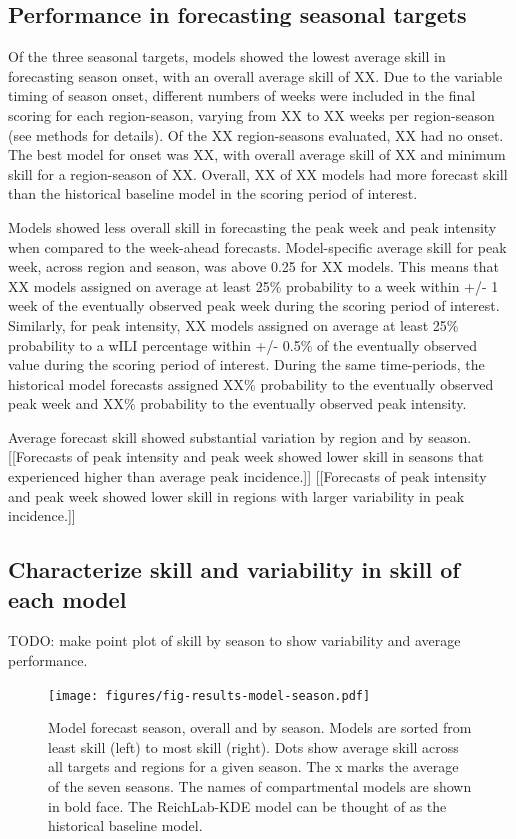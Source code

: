 \documentclass{article}\usepackage[]{graphicx}\usepackage[]{color}
\begin{document}
\subsection{Performance in forecasting seasonal targets}

Of the three seasonal targets, models showed the lowest average skill in forecasting season onset, with an overall average skill of XX. 
Due to the variable timing of season onset, different numbers of weeks were included in the final scoring for each region-season, varying from XX to XX weeks per region-season (see methods for details).
Of the XX region-seasons evaluated, XX had no onset. 
The best model for onset was XX, with overall average skill of XX and minimum skill for a region-season of XX.
Overall, XX of XX models had more forecast skill than the historical baseline model in the scoring period of interest.


Models showed less overall skill in forecasting the peak week and peak intensity when compared to the week-ahead forecasts.
Model-specific average skill for peak week, across region and season, was above 0.25 for XX models. 
This means that XX models assigned on average at least 25\% probability to a week within +/- 1 week of the eventually observed peak week during the scoring period of interest.
Similarly, for peak intensity, XX models assigned on average at least 25\% probability to a wILI percentage within +/- 0.5\% of the eventually observed value during the scoring period of interest.
During the same time-periods, the historical model forecasts assigned XX\% probability to the eventually observed peak week and XX\% probability to the eventually observed peak intensity.

Average forecast skill showed substantial variation by region and by season.
[[Forecasts of peak intensity and peak week showed lower skill in seasons that experienced higher than average peak incidence.]]
[[Forecasts of peak intensity and peak week showed lower skill in regions with larger variability in peak incidence.]]

\subsection{Characterize skill and variability in skill of each model}

TODO: make point plot of skill by season to show variability and average performance.

\begin{figure}[htbp]
\begin{center}
\texttt{[image: figures/fig-results-model-season.pdf]}
\caption{Model forecast season, overall and by season. Models are sorted from least skill (left) to most skill (right). Dots show average skill across all targets and regions for a given season. The x marks the average of the seven seasons. The names of compartmental models are shown in bold face. The ReichLab-KDE model can be thought of as the historical baseline model.}
\label{fig:results-season}
\end{center}
\end{figure}
\end{document}

